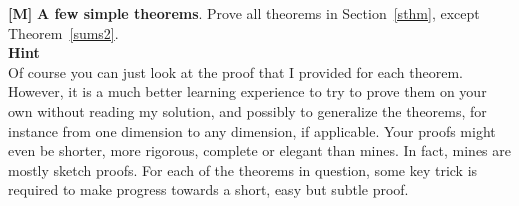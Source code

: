 \documentclass[10pt]{article}
\begin{document}
\begin{Exercise}\label{exercise2}
{\bf [M]}  {\bf A few simple theorems}. Prove all theorems in Section~\ref{sthm}, except Theorem~\ref{sums2}.\vspace{1ex} \\
{\bf Hint} \vspace{1ex}   \\
Of course you can just look at the proof that I provided for each theorem. However, it is a much better learning experience to try to prove them on your own without reading my solution, and possibly to generalize the theorems, for instance from one dimension to any dimension, if applicable. Your proofs might even be shorter, more rigorous, complete or elegant than mines. In fact, mines are mostly sketch proofs. For each of the theorems in question, some key trick is required to make progress towards a short, easy but subtle proof.
\end{Exercise}
\end{document}
